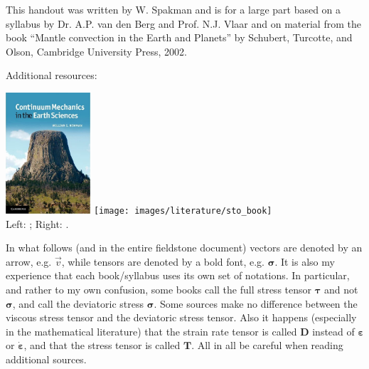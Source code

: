 
\begin{remark}
This handout was written by W. Spakman and 
is for a large part based on a syllabus by Dr. A.P. van den Berg and Prof. N.J. Vlaar
and on material from the book “Mantle convection in the Earth and Planets” by Schubert, Turcotte,
and Olson, Cambridge University Press, 2002.
\end{remark}


Additional resources:

\begin{center}
\includegraphics[height=4.5cm]{images/literature/newman}
\texttt{[image: images/literature/sto\_book]} \\
{\captionfont Left: ; Right: .}
\end{center}

In what follows (and in the entire fieldstone document) vectors are denoted by an arrow, e.g. $\vec{v}$,
while tensors are denoted by a bold font, e.g. ${\bm \sigma}$.
It is also my experience that each book/syllabus uses its own set of notations. In particular, 
and rather to my own confusion, some books call the full stress tensor ${\bm \tau}$ and not 
${\bm \sigma}$, and call the deviatoric stress ${\bm \sigma}$. Some sources
make no difference between the viscous stress tensor and the deviatoric stress tensor.
Also it happens (especially in the mathematical literature) that the strain 
rate tensor is called ${\bm D}$ instead of ${\bm \varepsilon}$ or $\dot{\bm \varepsilon}$, 
and that the stress tensor is called ${\bm T}$. 
All in all be careful when reading additional sources.


